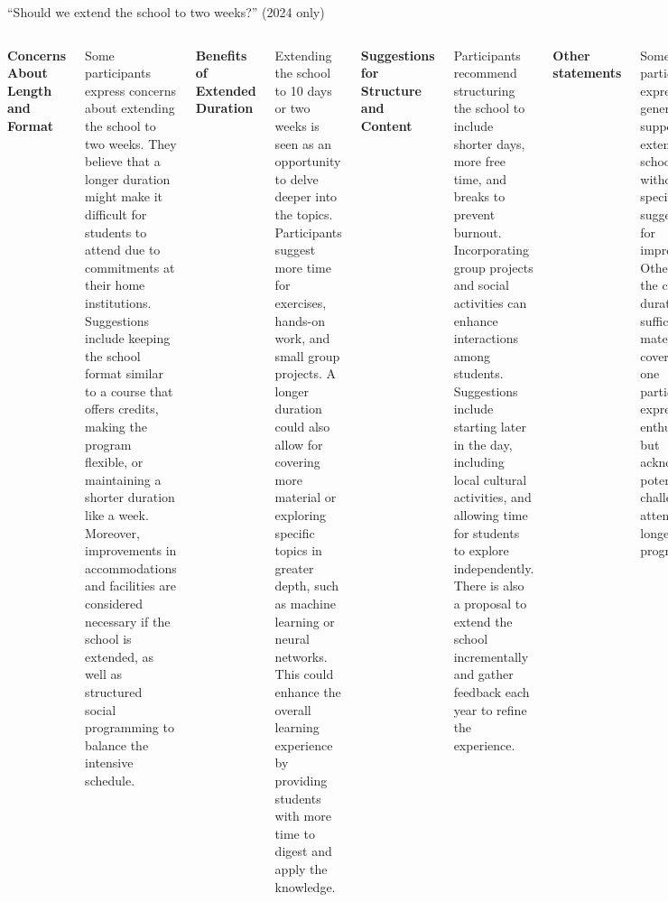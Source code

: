 \documentclass[aspectratio=169]{beamer}
\begin{document}
\begin{frame}{``Should we extend the school to two weeks?'' (2024 only)}
\tiny
\vspace{0.45 cm}
\begin{columns}
{\bf\small Concerns About Length and Format}

\vspace{0.1 cm}
Some participants express concerns about extending the school to two weeks. They believe that a longer duration might make it difficult for students to attend due to commitments at their home institutions. Suggestions include keeping the school format similar to a course that offers credits, making the program flexible, or maintaining a shorter duration like a week. Moreover, improvements in accommodations and facilities are considered necessary if the school is extended, as well as structured social programming to balance the intensive schedule.

\vspace{0.4 cm}
{\bf\small Benefits of Extended Duration}

\vspace{0.1 cm}
Extending the school to 10 days or two weeks is seen as an opportunity to delve deeper into the topics. Participants suggest more time for exercises, hands-on work, and small group projects. A longer duration could also allow for covering more material or exploring specific topics in greater depth, such as machine learning or neural networks. This could enhance the overall learning experience by providing students with more time to digest and apply the knowledge.

\vspace{0.4 cm}
{\bf\small Suggestions for Structure and Content}

\vspace{0.1 cm}
Participants recommend structuring the school to include shorter days, more free time, and breaks to prevent burnout. Incorporating group projects and social activities can enhance interactions among students. Suggestions include starting later in the day, including local cultural activities, and allowing time for students to explore independently. There is also a proposal to extend the school incrementally and gather feedback each year to refine the experience.

\vspace{0.4 cm}
{\bf\small Other statements}

\vspace{0.1 cm}
Some participants express general support for extending the school without specific suggestions for improvements. Others feel the current duration suffices for the material covered, while one participant expresses enthusiasm but acknowledges potential challenges in attending a longer program.
\end{columns}


\end{frame}
\end{document}
